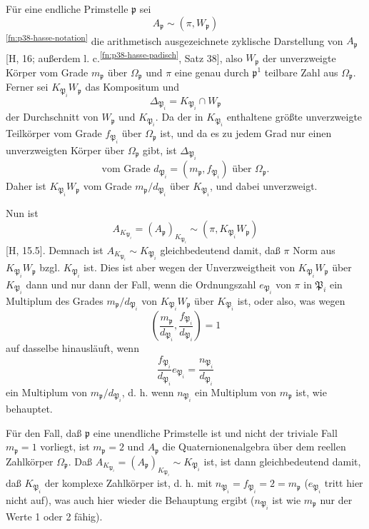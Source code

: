 Für eine endliche Primstelle \(\mathfrak p\) sei
\[
        A_{\mathfrak p}\sim(\pi,W_{\mathfrak p})
\]
\textsuperscript{\ref{fn:p38-hasse-notation}} die arithmetisch ausgezeichnete zyklische Darstellung von \(A_{\mathfrak p}\) [H, 16; außerdem l. c.\textsuperscript{\ref{fn:p38-hasse-padisch}}, Satz 38], also \(W_{\mathfrak p}\) der unverzweigte Körper vom Grade \(m_{\mathfrak p}\) über \(\Omega_{\mathfrak p}\) und \(\pi\) eine genau durch \(\mathfrak p^1\) teilbare Zahl aus \(\Omega_{\mathfrak p}\). Ferner sei \(K_{\mathfrak P_i}W_{\mathfrak p}\) das Kompositum und
\[
        \Delta_{\mathfrak P_i}=K_{\mathfrak P_i}\cap W_{\mathfrak p}
\]
der Durchschnitt von \(W_{\mathfrak p}\) und \(K_{\mathfrak P_i}\). Da der in \(K_{\mathfrak P_i}\) enthaltene größte unverzweigte Teilkörper vom Grade \(f_{\mathfrak P_i}\) über \(\Omega_{\mathfrak p}\) ist, und da es zu jedem Grad nur einen unverzweigten Körper über \(\Omega_{\mathfrak p}\) gibt, ist \(\Delta_{\mathfrak P_i}\)
\[
        \text{vom Grade }d_{\mathfrak P_i}=(m_{\mathfrak p},f_{\mathfrak P_i})\text{ über }\Omega_{\mathfrak p}.
\]
Daher ist \(K_{\mathfrak P_i}W_{\mathfrak p}\) vom Grade \(m_{\mathfrak p}/d_{\mathfrak P_i}\) über \(K_{\mathfrak P_i}\), und dabei unverzweigt.

Nun ist
\[
        A_{K_{\mathfrak P_i}}=(A_{\mathfrak p})_{K_{\mathfrak P_i}}\sim(\pi,K_{\mathfrak P_i}W_{\mathfrak p})
\]
[H, 15.5]. Demnach ist \(A_{K_{\mathfrak P_i}}\sim K_{\mathfrak P_i}\) gleichbedeutend damit, daß \(\pi\) Norm aus \(K_{\mathfrak P_i}W_{\mathfrak p}\) bzgl. \(K_{\mathfrak P_i}\) ist. Dies ist aber wegen der Unverzweigtheit von \(K_{\mathfrak P_i}W_{\mathfrak p}\) über \(K_{\mathfrak P_i}\) dann und nur dann der Fall, wenn die Ordnungszahl \(e_{\mathfrak P_i}\) von \(\pi\) in \(\mathfrak P_i\) ein Multiplum des Grades \(m_{\mathfrak p}/d_{\mathfrak P_i}\) von \(K_{\mathfrak P_i}W_{\mathfrak p}\) über \(K_{\mathfrak P_i}\) ist, oder also, was wegen
\[
\left(\frac{m_{\mathfrak p}}{d_{\mathfrak P_i}},\frac{f_{\mathfrak P_i}}{d_{\mathfrak P_i}}\right)=1
\]
auf dasselbe hinausläuft, wenn
\[
\frac{f_{\mathfrak P_i}}{d_{\mathfrak P_i}}e_{\mathfrak P_i}=\frac{n_{\mathfrak P_i}}{d_{\mathfrak P_i}}
\]
ein Multiplum von \(m_{\mathfrak p}/d_{\mathfrak P_i}\), d. h. wenn \(n_{\mathfrak P_i}\) ein Multiplum von \(m_{\mathfrak p}\) ist, wie behauptet.

Für den Fall, daß \(\mathfrak p\) eine unendliche Primstelle ist und nicht der triviale Fall \(m_{\mathfrak p}=1\) vorliegt, ist \(m_{\mathfrak p}=2\) und \(A_{\mathfrak p}\) die Quaternionenalgebra über dem reellen Zahlkörper \(\Omega_{\mathfrak p}\). Daß \(A_{K_{\mathfrak P_i}}=(A_{\mathfrak p})_{K_{\mathfrak P_i}}\sim K_{\mathfrak P_i}\) ist, ist dann gleichbedeutend damit, daß \(K_{\mathfrak P_i}\) der komplexe Zahlkörper ist, d. h. mit \(n_{\mathfrak P_i}=f_{\mathfrak P_i}=2=m_{\mathfrak p}\) (\(e_{\mathfrak P_i}\) tritt hier nicht auf), was auch hier wieder die Behauptung ergibt (\(n_{\mathfrak P_i}\) ist wie \(m_{\mathfrak p}\) nur der Werte 1 oder 2 fähig).

